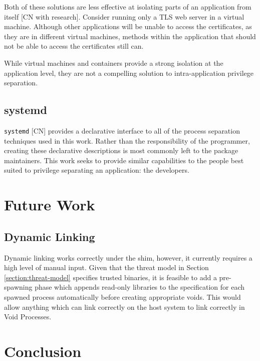 \documentclass[sigplan]{acmart}
\begin{document}
Both of these solutions are less effective at isolating parts of an application from itself [CN with research]. Consider running only a TLS web server in a virtual machine. Although other applications will be unable to access the certificates, as they are in different virtual machines, methods within the application that should not be able to access the certificates still can.

While virtual machines and containers provide a strong isolation at the application level, they are not a compelling solution to intra-application privilege separation.

\subsection{systemd}

\texttt{systemd} [CN] provides a declarative interface to all of the process separation techniques used in this work. Rather than the responsibility of the programmer, creating these declarative descriptions is most commonly left to the package maintainers. This work seeks to provide similar capabilities to the people best suited to privilege separating an application: the developers.


\section{Future Work}

\subsection{Dynamic Linking}

Dynamic linking works correctly under the shim, however, it currently requires a high level of manual input. Given that the threat model in Section \ref{section:threat-model} specifies trusted binaries, it is feasible to add a pre-spawning phase which appends read-only libraries to the specification for each spawned process automatically before creating appropriate voids. This would allow anything which can link correctly on the host system to link correctly in Void Processes.


\section{Conclusion}


\begin{acks}
\end{acks}




\appendix
\end{document}

